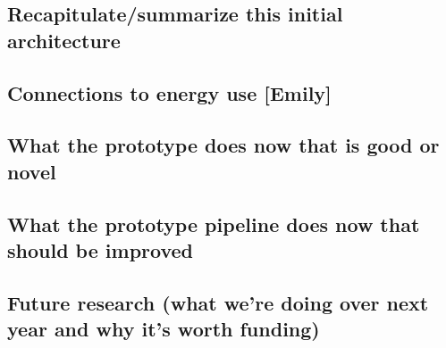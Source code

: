 \subsection{Recapitulate/summarize this initial architecture}
\subsection{Connections to energy use [Emily]}
\subsection{What the prototype does now that is good or novel}
\subsection{What the prototype pipeline does now that should be improved}
\subsection{Future research (what we’re doing over next year and why it’s worth funding)}